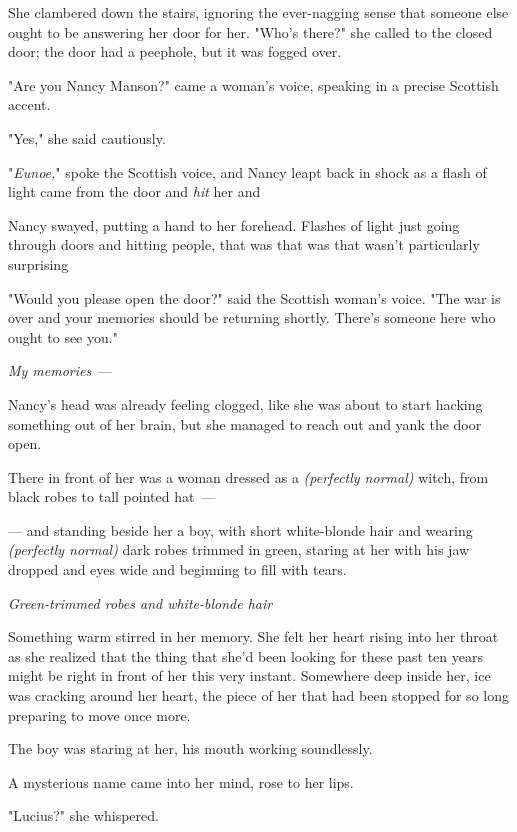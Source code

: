 She clambered down the stairs, ignoring the ever-nagging sense that someone
else ought to be answering her door for her. "Who's there?" she called to the
closed door; the door had a peephole, but it was fogged over.

"Are you Nancy Manson?" came a woman's voice, speaking in a precise Scottish
accent.

"Yes," she said cautiously.

"\emph{Eunoe,}" spoke the Scottish voice, and Nancy leapt back in shock as a
flash of light came from the door and \emph{hit} her and{\el}

Nancy swayed, putting a hand to her forehead. Flashes of light just going
through doors and hitting people, that was{\el} that was{\el} that wasn't
particularly surprising{\el}

"Would you please open the door?" said the Scottish woman's voice. "The war is
over and your memories should be returning shortly. There's someone here who
ought to see you."

\emph{My memories}~---

Nancy's head was already feeling clogged, like she was about to start hacking
something out of her brain, but she managed to reach out and yank the door open.

There in front of her was a woman dressed as a \emph{(perfectly normal)} witch,
from black robes to tall pointed hat~---

--- and standing beside her a boy, with short white-blonde hair and wearing
\emph{(perfectly normal)} dark robes trimmed in green, staring at her with his
jaw dropped and eyes wide and beginning to fill with tears.

\emph{Green-trimmed robes and white-blonde hair{\el}}

Something warm stirred in her memory. She felt her heart rising into her throat
as she realized that the thing that she'd been looking for these past ten years
might be right in front of her this very instant. Somewhere deep inside her,
ice was cracking around her heart, the piece of her that had been stopped for
so long preparing to move once more.

The boy was staring at her, his mouth working soundlessly.

A mysterious name came into her mind, rose to her lips.

"Lucius?" she whispered.
